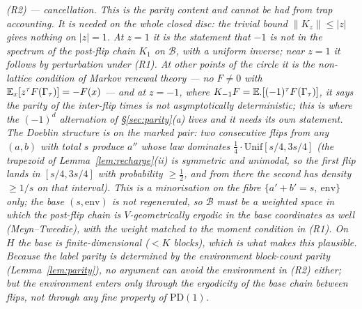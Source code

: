 \emph{(R2) --- cancellation.  This is the parity content and cannot be
had from trap accounting.  It is needed on the whole closed disc: the
trivial bound $\|K_z\|\le|z|$ gives nothing on $|z|=1$.  At $z=1$ it
is the statement that $-1$ is not in the spectrum of the post-flip
chain $K_1$ on $\mathcal B$, with a uniform inverse; near $z=1$ it
follows by perturbation under (R1).  At other points of the circle it
is the non-lattice condition of Markov renewal theory --- no $F\ne0$
with $\mathbb{E}_x[z^{\tau}F(\Gamma_\tau)]=-F(x)$ --- and at $z=-1$, where
$K_{-1}F=\mathbb{E}_\cdot[(-1)^{\tau}F(\Gamma_\tau)]$, it says the parity of the
inter-flip times is not asymptotically deterministic; this is where
the $(-1)^d$ alternation of \S\ref{sec:parity}(a) lives and it needs
its own statement.  The Doeblin structure is on the marked pair: two consecutive
flips from any $(a,b)$ with total $s$ produce $a''$ whose law dominates
$\tfrac14\cdot\mathrm{Unif}[s/4,3s/4]$ (the trapezoid of
Lemma~\ref{lem:recharge}(ii) is symmetric and unimodal, so the first
flip lands in $[s/4,3s/4]$ with probability $\ge\tfrac12$, and from
there the second has density $\ge1/s$ on that interval).  This is a
minorisation on the fibre $\{a'+b'=s,\ \mathrm{env}\}$ only; the base
$(s,\mathrm{env})$ is not regenerated, so $\mathcal B$ must be a
weighted space in which the post-flip chain is $V$-geometrically
ergodic in the base coordinates as well (Meyn--Tweedie), with the
weight matched to the moment condition in (R1).  On $H$ the base is
finite-dimensional ($<K$ blocks), which is what makes this plausible.
Because the label parity is determined by the environment block-count
parity (Lemma~\ref{lem:parity}), no argument can avoid the environment
in (R2) either; but the environment enters only through the ergodicity
of the base chain between flips, not through any fine property of
$\mathrm{PD}(1)$.}

